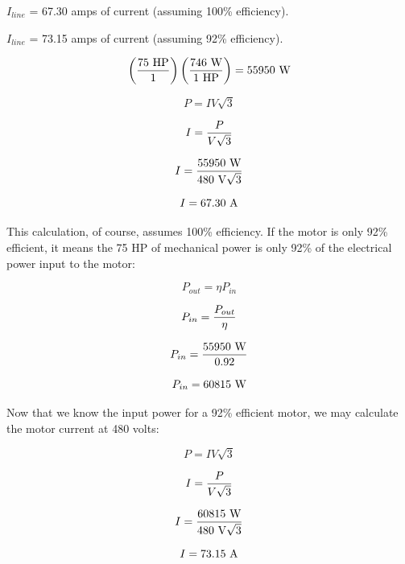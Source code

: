 
$I_{line}$ = 67.30 amps of current (assuming 100\% efficiency).

\vskip 10pt

$I_{line}$ = 73.15 amps of current (assuming 92\% efficiency).







$$\left(75 \hbox{ HP} \over 1 \right) \left(746 \hbox{ W} \over 1 \hbox{ HP} \right) = 55950 \hbox{ W}$$

$$P = I V \sqrt{3}$$

$$I = {P \over {V \sqrt{3}}}$$

$$I = {55950 \hbox{ W} \over {480 \hbox{ V} \sqrt{3}}}$$

$$I = 67.30 \hbox{ A}$$

This calculation, of course, assumes 100\% efficiency.  If the motor is only 92\% efficient, it means the 75 HP of mechanical power is only 92\% of the electrical power input to the motor:

$$P_{out} = \eta P_{in}$$

$$P_{in} = {P_{out} \over \eta}$$

$$P_{in} = {55950 \hbox{ W} \over 0.92}$$

$$P_{in} = 60815 \hbox{ W}$$

Now that we know the input power for a 92\% efficient motor, we may calculate the motor current at 480 volts:

$$P = I V \sqrt{3}$$

$$I = {P \over {V \sqrt{3}}}$$

$$I = {60815 \hbox{ W} \over {480 \hbox{ V} \sqrt{3}}}$$

$$I = 73.15 \hbox{ A}$$




